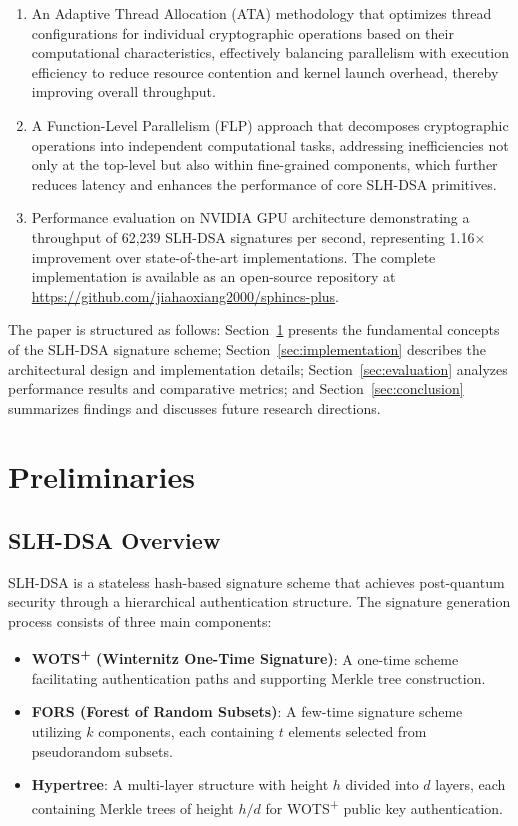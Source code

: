 \documentclass[journal]{IEEEtran}
\begin{document}
\begin{enumerate}
  \item An Adaptive Thread Allocation (ATA) methodology that optimizes thread configurations for individual cryptographic operations based on their computational characteristics, effectively balancing parallelism with execution efficiency to reduce resource contention and kernel launch overhead, thereby improving overall throughput.

  \item A Function-Level Parallelism (FLP) approach that decomposes cryptographic operations into independent computational tasks, addressing inefficiencies not only at the top-level but also within fine-grained components, which further reduces latency and enhances the performance of core SLH-DSA primitives.

  \item Performance evaluation on NVIDIA GPU architecture demonstrating a throughput of 62,239 SLH-DSA signatures per second, representing 1.16$\times$ improvement over state-of-the-art implementations. The complete implementation is available as an open-source repository at \url{https://github.com/jiahaoxiang2000/sphincs-plus}.
\end{enumerate}

The paper is structured as follows: Section~\ref{sec:preliminaries} presents the fundamental concepts of the SLH-DSA signature scheme; Section~\ref{sec:implementation} describes the architectural design and implementation details; Section~\ref{sec:evaluation} analyzes performance results and comparative metrics; and Section~\ref{sec:conclusion} summarizes findings and discusses future research directions.

\section{Preliminaries}\label{sec:preliminaries}

\subsection{SLH-DSA Overview}

SLH-DSA is a stateless hash-based signature scheme that achieves post-quantum security through a hierarchical authentication structure. The signature generation process consists of three main components:

\begin{itemize}
  \item \textbf{WOTS\textsuperscript{+} (Winternitz One-Time Signature)}: A one-time scheme facilitating authentication paths and supporting Merkle tree construction.
  \item \textbf{FORS (Forest of Random Subsets)}: A few-time signature scheme utilizing $k$ components, each containing $t$ elements selected from pseudorandom subsets.
  \item \textbf{Hypertree}: A multi-layer structure with height $h$ divided into $d$ layers, each containing Merkle trees of height $h/d$ for WOTS\textsuperscript{+} public key authentication.
\end{itemize}
\end{document}
